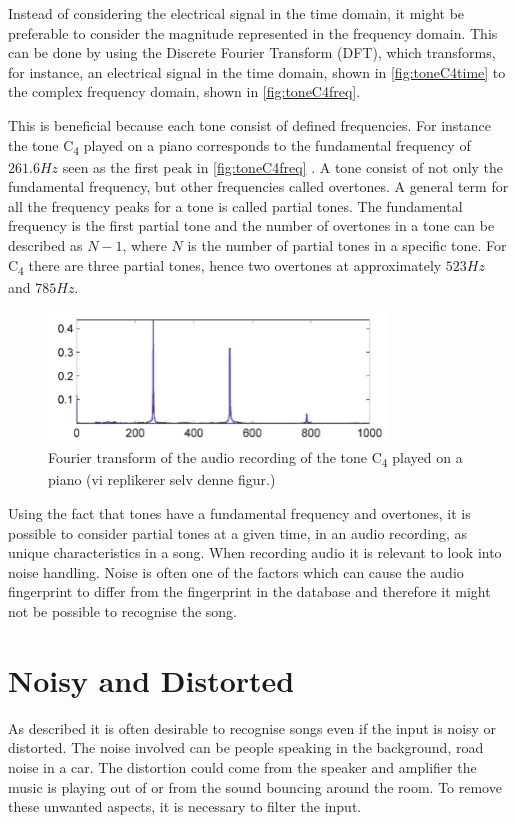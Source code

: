 Instead of considering the electrical signal in the time domain, it might be preferable to consider the magnitude represented in the frequency domain. This can be done by using the Discrete Fourier Transform (DFT), which transforms, for instance, an electrical signal in the time domain, shown in \autoref{fig:toneC4time} to the complex frequency domain, shown in \autoref{fig:toneC4freq}.

This is beneficial because each tone consist of defined frequencies. For instance the tone C\textsubscript{4} played on a piano corresponds to the fundamental frequency of $261.6 \si{Hz}$ seen as the first peak in \autoref{fig:toneC4freq} \cite[29]{Meinard2015Fundamentals}. A tone consist of not only the fundamental frequency, but other frequencies called overtones. A general term for all the frequency peaks for a tone is called partial tones. The fundamental frequency is the first partial tone and the number of overtones in a tone can be described as $N-1$, where $N$ is the number of partial tones in a specific tone. For C\textsubscript{4} there are three partial tones, hence two overtones at approximately $523 \si{Hz}$ and $ 785 \si{Hz}$. \cite[41]{Meinard2015Fundamentals}
\begin{figure}[H]
    \centering
    \includegraphics[width=0.8\textwidth]{figures/toneC4freq.JPG}
    \caption{Fourier transform of the audio recording of the tone C\textsubscript{4} played on a piano (vi replikerer selv denne figur.)}
    \label{fig:toneC4freq}
\end{figure}
Using the fact that tones have a fundamental frequency and overtones, it is possible to consider partial tones at a given time, in an audio recording, as unique characteristics in a song. When recording audio it is relevant to look into noise handling. Noise is often one of the factors which can cause the audio fingerprint to differ from the fingerprint in the database and therefore it might not be possible to recognise the song.\\

\section{Noisy and Distorted}
As described it is often desirable to recognise songs even if the input is noisy or distorted. The noise involved can be people speaking in the background, road noise in a car. The distortion could come from the speaker and amplifier the music is playing out of or from the sound bouncing around the room. To remove these unwanted aspects, it is necessary to filter the input.\cite{haitsma2003highly}\\



